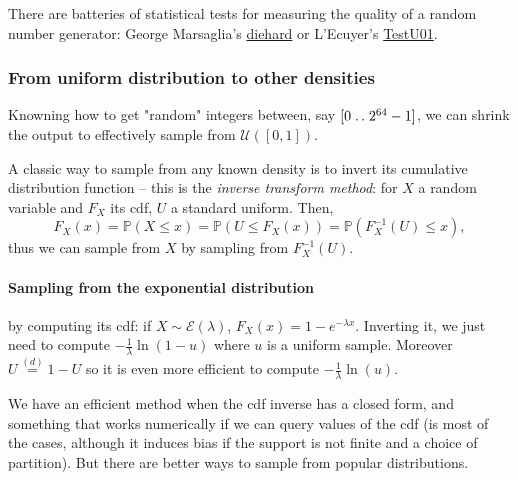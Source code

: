 There are batteries of statistical tests for measuring the quality of a random number generator: George Marsaglia's \href{https://en.wikipedia.org/wiki/Diehard_tests}{diehard} or L'Ecuyer's \href{https://simul.iro.umontreal.ca/testu01/tu01.html}{TestU01}.

\subsubsection*{From uniform distribution to other densities}

Knowning how to get "random" integers between, say $[0\mathrel{{.}\,{.}}\nobreak 2^{64}-1]$, we can shrink the output to effectively sample from $\mathcal{U}\left([0,1]\right)$.

A classic way to sample from any known density is to invert its cumulative distribution function -- this is the \textit{inverse transform method}: for $X$ a random variable and $F_X$ its cdf, $U$ a standard uniform. Then, \[F_X(x) = \mathbb{P}(X \leq x) = \mathbb{P}(U \leq F_X(x)) = \mathbb{P}(F_X^{-1}(U) \leq x),\]
thus we can sample from $X$ by sampling from $F_X^{-1}(U)$.

\paragraph*{Sampling from the exponential distribution} by computing its cdf: if $X \sim \mathcal{E}(\lambda)$, $F_X(x) = 1 - e^{-\lambda x}$. Inverting it, we just need to compute $-\frac1{\lambda} \ln(1-u)$ where $u$ is a uniform sample. Moreover $U \stackrel{(d)}{=} 1-U$ so it is even more efficient to compute $-\frac1{\lambda} \ln(u)$.

We have an efficient method when the cdf inverse has a closed form, and something that works numerically if we can query values of the cdf (is most of the cases, although it induces bias if the support is not finite and a choice of partition). But there are better ways to sample from popular distributions.

